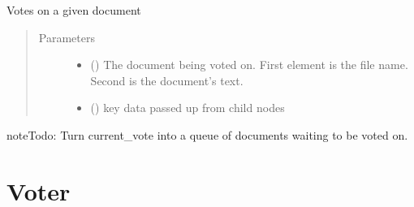 \documentclass[letterpaper,10pt,english]{sphinxmanual}
\begin{document}
\begin{fulllineitems}
\begin{fulllineitems}
\label{\detokenize{index:ThresTree.TreeNode.vote}}
Votes on a given document
\begin{quote}\begin{description}
\item[{Parameters}] \leavevmode\begin{itemize}
\item {} 
 (\sphinxstyleliteralemphasis{, }) \textendash{} The document being voted on. First element is the file name. Second is the document’s text.

\item {} 
 (\sphinxstyleliteralemphasis{, }) \textendash{} key data passed up from child nodes

\end{itemize}

\end{description}\end{quote}

\begin{sphinxadmonition}{note}{Todo:}
Turn current\_vote into a queue of documents waiting to be voted on.
\end{sphinxadmonition}

\end{fulllineitems}


\end{fulllineitems}

\label{\detokenize{index:module-Voter}}

\chapter{Voter}
\label{\detokenize{index:voter}}
\end{document}
